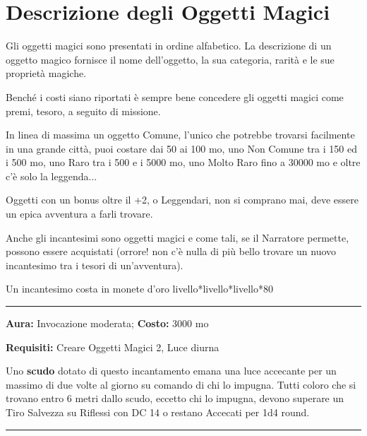 \section{Descrizione degli Oggetti Magici}

\begin{multicols}{2}

Gli oggetti magici sono presentati in ordine alfabetico. La descrizione di un oggetto magico fornisce il nome dell'oggetto, la sua categoria, rarità e le sue proprietà magiche.

Benché i costi siano riportati è sempre bene concedere gli oggetti magici come premi, tesoro, a seguito di missione.

In linea di massima un oggetto Comune, l'unico che potrebbe trovarsi facilmente in una grande città, puoi costare dai 50 ai 100 mo, uno Non Comune tra i 150 ed i 500 mo, uno Raro tra i 500 e i 5000 mo, uno Molto Raro fino a 30000 mo e oltre c'è solo la leggenda...

Oggetti con un bonus oltre il +2, o Leggendari, non si comprano mai, deve essere un epica avventura a farli trovare.

\medskip

Anche gli incantesimi sono oggetti magici e come tali, se il Narratore permette, possono essere acquistati (orrore! non c'è nulla di più bello trovare un nuovo incantesimo tra i tesori di un'avventura).

Un incantesimo costa in monete d'oro livello*livello*livello*80

\medskip

\smallskip\noindent\rule{\linewidth}{2pt}  \hypertarget{Accecante}{}\smallskip{}\noindent\label{Accecante}

\textbf{Aura:} Invocazione moderata; \textbf{Costo:} 3000 mo

\textbf{Requisiti:} Creare Oggetti Magici 2, Luce diurna

Uno \textbf{scudo} dotato di questo incantamento emana una luce accecante per un massimo di due volte al giorno su comando di chi lo impugna. Tutti coloro che si trovano entro 6 metri dallo scudo, eccetto chi lo impugna, devono superare un Tiro Salvezza su Riflessi con DC 14 o restano Accecati per 1d4 round.

\smallskip\noindent\rule{\linewidth}{2pt}  \hypertarget{AccumulaIncantesimi}{}\smallskip{}\noindent\label{AccumulaIncantesimi}


\end{multicols}
